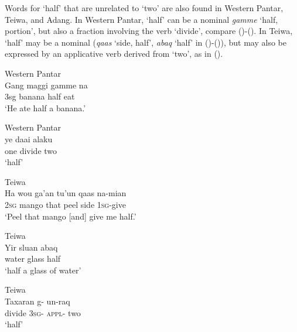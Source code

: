 Words for `half' that are unrelated to `two' are also found in Western Pantar,  Teiwa, and Adang.  In Western Pantar, `half' can be a nominal \textit{gamme} `half, portion', but also a fraction involving the verb `divide', compare ()-(). In Teiwa, `half' may be a nominal (\textit{qaas} `side, half', \textit{abaq} `half' in ()-()), but may also be expressed by an applicative verb derived from `two', as in ().


\ea%
\label{bkm:Ref342746707}
Western Pantar\\
\gll   Gang  maggi  gamme  na  \\
      3sg  banana  half  eat  \\
\glt  `He ate half a banana.'
\z








\ea%
\label{bkm:Ref342746708}
Western Pantar\\
\gll  ye  daai  alaku   \\
    one  divide  two    \\
\glt  `half'
\z








\ea%
\label{bkm:Ref342746924}
Teiwa\\
\gll  Ha  wou  ga'an  tu'un  qaas  na-mian \\
     \textsc{2sg } mango  that  peel  side  \textsc{1sg}{}-give \\
\glt  `Peel that mango [and] give me half.'
\z








\ea%
\label{bkm:Ref342746926}
Teiwa\\
\gll   Yir  sluan  abaq   \\
    water  glass  half      \\
\glt  `half a glass of water'
\z








\ea%
\label{bkm:Ref342746963}
Teiwa\\
\gll   Taxaran  g-  un-raq   \\
   divide  \textsc{3sg-}  \textsc{appl-} two      \\
\glt `half'
\z




